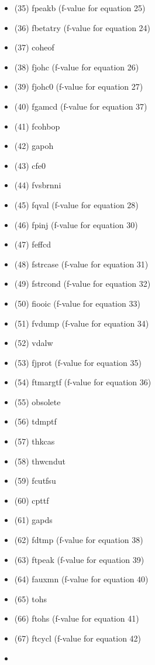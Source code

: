 \documentclass[]{article}
\begin{document}
\begin{itemize}
\begin{itemize}
  \item
    (35) fpeakb (f-value for equation 25)
  \item
    (36) fbetatry (f-value for equation 24)
  \item
    (37) coheof
  \item
    (38) fjohc (f-value for equation 26)
  \item
    (39) fjohc0 (f-value for equation 27)
  \item
    (40) fgamcd (f-value for equation 37)
  \item
    (41) fcohbop
  \item
    (42) gapoh
  \item
    (43) cfe0
  \item
    (44) fvsbrnni
  \item
    (45) fqval (f-value for equation 28)
  \item
    (46) fpinj (f-value for equation 30)
  \item
    (47) feffcd
  \item
    (48) fstrcase (f-value for equation 31)
  \item
    (49) fstrcond (f-value for equation 32)
  \item
    (50) fiooic (f-value for equation 33)
  \item
    (51) fvdump (f-value for equation 34)
  \item
    (52) vdalw
  \item
    (53) fjprot (f-value for equation 35)
  \item
    (54) ftmargtf (f-value for equation 36)
  \item
    (55) obsolete
  \item
    (56) tdmptf
  \item
    (57) thkcas
  \item
    (58) thwcndut
  \item
    (59) fcutfsu
  \item
    (60) cpttf
  \item
    (61) gapds
  \item
    (62) fdtmp (f-value for equation 38)
  \item
    (63) ftpeak (f-value for equation 39)
  \item
    (64) fauxmn (f-value for equation 40)
  \item
    (65) tohs
  \item
    (66) ftohs (f-value for equation 41)
  \item
    (67) ftcycl (f-value for equation 42)
  \item

\end{itemize}
\end{itemize}
\end{document}
